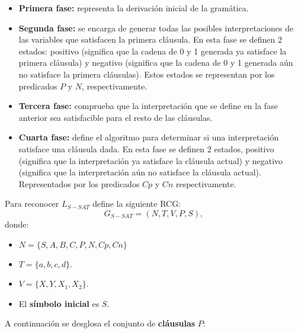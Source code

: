 \begin{itemize}
    \item \textbf{Primera fase:} representa la derivación inicial de la gramática.
    \item \textbf{Segunda fase:} se encarga de generar todas las posibles interpretaciones
          de las variables que satisfacen la primera cláusula. En esta fase se definen 2 estados: positivo (significa
          que la cadena de 0 y 1 generada ya satisface la primera cláusula) y negativo (significa que la cadena de 0 y 1
          generada aún no satisface la primera cláusulas). Estos estados se representan por los predicados $P$ y $N$, respectivamente.

    \item \textbf{Tercera fase:} comprueba que la interpretación que se define en la fase anterior sea satisfacible para
          el resto de las cláusulas.
    \item \textbf{Cuarta fase:} define el algoritmo para determinar si una interpretación satisface una cláusula
          dada. En esta fase se definen 2 estados, positivo (significa que la interpretación ya satisface la cláusula
          actual) y negativo (significa que la interpretación aún no satisface la cláusula actual). Representados por
          los predicados $Cp$ y $Cn$ respectivamente.

\end{itemize}



Para reconocer $L_{S-SAT}$ define la siguiente RCG:
\[
    G_{S-SAT} = (N, T, V, P, S),
\]
donde:

\begin{itemize}
    \item $N=\{S,A,B,C,P,N,Cp,Cn\}$
    \item $T=\{a,b,c,d\}$.
    \item $V=\{X,Y,X_1,X_2\}$.
    \item El \textbf{símbolo inicial} es $S$.
\end{itemize}

A continuación se desglosa el conjunto de \textbf{cláusulas} $P$:

